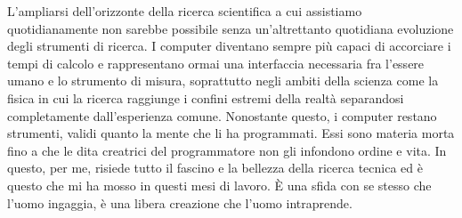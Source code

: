 \documentclass[../main.tex]{subfiles}
\begin{document}
L'ampliarsi dell'orizzonte della ricerca scientifica a cui assistiamo quotidianamente non sarebbe possibile senza un'altrettanto quotidiana evoluzione degli strumenti di ricerca. I computer diventano sempre più capaci di accorciare i tempi di calcolo e rappresentano ormai una interfaccia necessaria fra l'essere umano e lo strumento di misura, soprattutto negli ambiti della scienza come la fisica in cui la ricerca raggiunge i confini estremi della realtà separandosi completamente dall'esperienza comune. Nonostante questo, i computer restano strumenti, validi quanto la mente che li ha programmati. Essi sono materia morta fino a che le dita creatrici del programmatore non gli infondono ordine e vita. In questo, per me, risiede tutto il fascino e la bellezza della ricerca tecnica ed è questo che mi ha mosso in questi mesi di lavoro. È una sfida con se stesso che l'uomo ingaggia, è una libera creazione che l'uomo intraprende.
\end{document}
